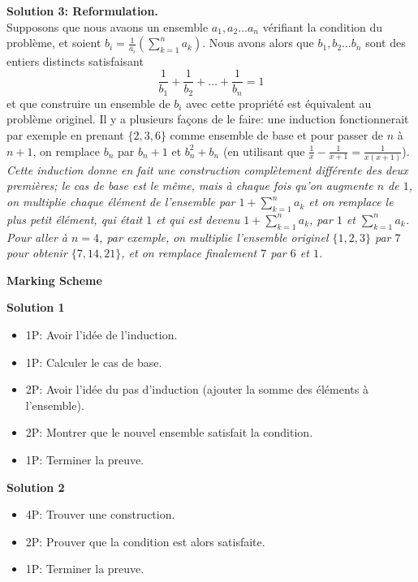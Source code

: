{%

\textbf{Solution 3: Reformulation.}\\ Supposons que nous avaons un ensemble $a_1, a_2 \dots a_n$ vérifiant la condition du problème, et soient $b_i = \frac{1}{a_i}(\sum_{k=1}^n a_k)$. Nous avons alors que $b_1, b_2 \dots b_n$ sont des entiers distincts satisfaisant
\[
\frac{1}{b_1}+\frac{1}{b_2}+\dots+\frac{1}{b_n} = 1
\]
et que construire un ensemble de $b_i$ avec cette propriété est équivalent au problème originel. Il y a plusieurs façons de le faire: une induction fonctionnerait par exemple en prenant $\{2, 3, 6\}$ comme ensemble de base et pour passer de $n$ à $n+1$, on remplace $b_n$ par $b_n+1$ et $b_n^2+b_n$ (en utilisant que $\frac{1}{x}-\frac{1}{x+1} = \frac{1}{x(x+1)}$). \\
\emph{Cette induction donne en fait une construction complètement différente des deux premières; le cas de base est le même, mais à chaque fois qu'on augmente $n$ de $1$, on multiplie chaque élément de l'ensemble par $1 + \sum_{k=1}^n a_k$ et on remplace le plus petit élément, qui était $1$ et qui est devenu $1 + \sum_{k=1}^n a_k$, par $1$ et $\sum_{k=1}^n a_k$. Pour aller à $n=4$, par exemple, on multiplie l'ensemble originel $\{1, 2, 3\}$ par $7$ pour obtenir $\{7, 14, 21\}$, et on remplace finalement $7$ par $6$ et $1$.}

\bigskip

\textbf{Marking Scheme}

\textbf{Solution 1}
\begin{itemize}
\item 1P: Avoir l'idée de l'induction.
\item 1P: Calculer le cas de base.
\item 2P: Avoir l'idée du pas d'induction (ajouter la somme des éléments à l'ensemble).
\item 2P: Montrer que le nouvel ensemble satisfait la condition.
\item 1P: Terminer la preuve.
\end{itemize}
\textbf{Solution 2}
\begin{itemize}
\item 4P: Trouver une construction.
\item 2P: Prouver que la condition est alors satisfaite.
\item 1P: Terminer la preuve.
\end{itemize}
}

